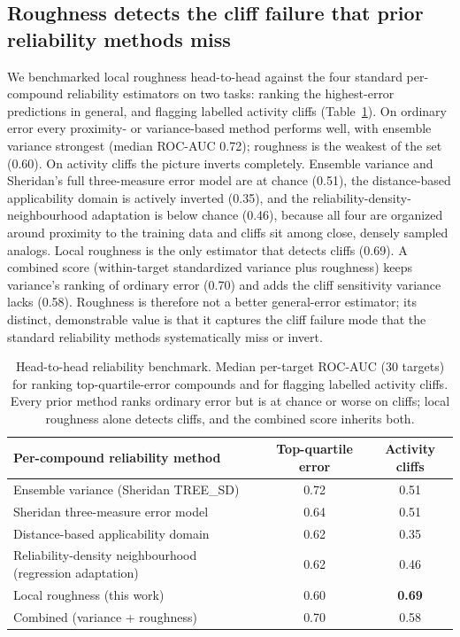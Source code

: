 \documentclass[11pt,letterpaper]{article}
\begin{document}
\subsection*{Roughness detects the cliff failure that prior reliability methods miss}
We benchmarked local roughness head-to-head against the four standard per-compound reliability estimators on two tasks: ranking the highest-error predictions in general, and flagging labelled activity cliffs (Table~\ref{tab:headtohead}). On ordinary error every proximity- or variance-based method performs well, with ensemble variance strongest (median ROC-AUC 0.72); roughness is the weakest of the set (0.60). On activity cliffs the picture inverts completely. Ensemble variance and Sheridan's full three-measure error model are at chance (0.51), the distance-based applicability domain is actively inverted (0.35), and the reliability-density-neighbourhood adaptation is below chance (0.46), because all four are organized around proximity to the training data and cliffs sit among close, densely sampled analogs. Local roughness is the only estimator that detects cliffs (0.69). A combined score (within-target standardized variance plus roughness) keeps variance's ranking of ordinary error (0.70) and adds the cliff sensitivity variance lacks (0.58). Roughness is therefore not a better general-error estimator; its distinct, demonstrable value is that it captures the cliff failure mode that the standard reliability methods systematically miss or invert.

\begin{table}[htbp]
\caption{Head-to-head reliability benchmark. Median per-target ROC-AUC (30 targets) for ranking top-quartile-error compounds and for flagging labelled activity cliffs. Every prior method ranks ordinary error but is at chance or worse on cliffs; local roughness alone detects cliffs, and the combined score inherits both.}
\label{tab:headtohead}
\centering
\begin{tabular}{lcc}
\hline
Per-compound reliability method & Top-quartile error & Activity cliffs \\
\hline
Ensemble variance (Sheridan TREE\_SD)\cite{sheridan2012} & 0.72 & 0.51 \\
Sheridan three-measure error model\cite{sheridan2012} & 0.64 & 0.51 \\
Distance-based applicability domain\cite{sahigara2012} & 0.62 & 0.35 \\
Reliability-density neighbourhood (regression adaptation)\cite{aniceto2016} & 0.62 & 0.46 \\
Local roughness (this work) & 0.60 & \textbf{0.69} \\
Combined (variance + roughness) & 0.70 & 0.58 \\
\hline
\end{tabular}
\end{table}
\end{document}
